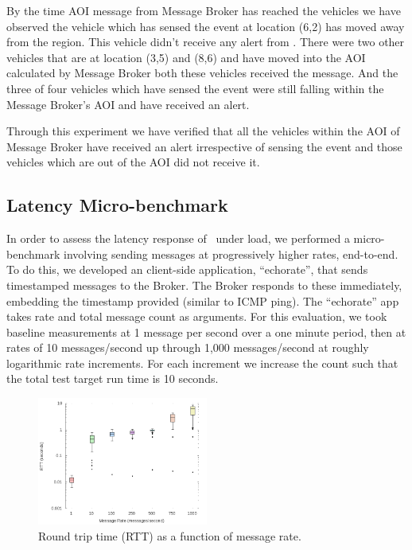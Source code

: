 By the time AOI message from Message Broker has reached the vehicles
we have observed the vehicle which has sensed the event at location
(6,2) has moved away from the region. This vehicle didn't receive any
alert from \name.  There were two other vehicles that are at
location (3,5) and (8,6) and have moved into the AOI calculated by
Message Broker both these vehicles received the message. And the three
of four vehicles which have sensed the event were still falling within
the Message Broker's AOI and have received an alert.
   
Through this experiment we have verified that all the vehicles within the
AOI of Message Broker have received an alert irrespective of sensing
the event and those vehicles which are out of the AOI did not receive it.

\subsection{Latency Micro-benchmark}

In order to assess the latency response of \name~under load, we
performed a micro-benchmark involving sending messages at
progressively higher rates, end-to-end. To do this, we developed an
client-side application, ``echorate'', that sends timestamped messages
to the Broker. The Broker responds to these immediately, embedding the
timestamp provided (similar to ICMP ping). The ``echorate'' app takes
rate and total message count as arguments. For this evaluation, we
took baseline measurements at 1 message per second over a one minute
period, then at rates of 10 messages/second up through 1,000
messages/second at roughly logarithmic rate increments. For each increment
we increase the count such that the total test target run time is
10 seconds.

\begin{figure}[ht]
  \begin{center}
    \includegraphics[width=0.5\textwidth]{figs/RTT.png}
    \caption{Round trip time (RTT) as a function of message rate.}
    \label{fig:RTT}
  \end{center}
\end{figure}

